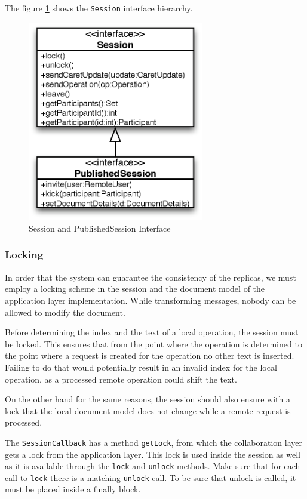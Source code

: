 The figure \ref{fig:archoverview.session} shows the \texttt{Session} interface
hierarchy.

\begin{figure}[H]
 \centering
 \includegraphics[width=7.69cm,height=8.75cm]{../images/finalreport/architecture_session_uml.eps}
 \caption{Session and PublishedSession Interface}
 \label{fig:archoverview.session}
\end{figure}


\subsubsection{Locking}
In order that the system can guarantee the consistency of the replicas, we
must employ a locking scheme in the session and the document model of
the application layer implementation. While transforming messages, nobody
can be allowed to modify the document. 

Before determining the index and the text of a local operation, the session must
be locked. This ensures that from the point where the operation is determined
to the point where a request is created for the operation no other text is
inserted. Failing to do that would potentially result in an invalid index for
the local operation, as a processed remote operation could shift the text.

On the other hand for the same reasons, the session should also ensure with a 
lock that the local document model does not change while a remote request is 
processed.

The \texttt{SessionCallback} has a method \texttt{getLock}, from which
the collaboration layer gets a lock from the application layer. This
lock is used inside the session as well as it is available through the
\texttt{lock} and \texttt{unlock} methods. Make sure that for each call to
\texttt{lock} there is a matching \texttt{unlock} call. To be sure that unlock
is called, it must be placed inside a finally block.

